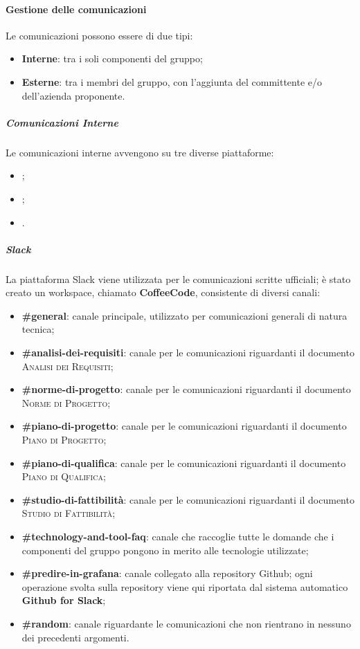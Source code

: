\documentclass[../norme-di-progetto.tex]{subfiles}
\begin{document}
\paragraph{Gestione delle comunicazioni}
Le comunicazioni possono essere di due tipi:
\begin{itemize}
  \item \textbf{Interne}: tra i soli componenti del gruppo;
  \item \textbf{Esterne}: tra i membri del gruppo, con l'aggiunta del committente e/o dell'azienda proponente.
\end{itemize}
\subparagraph{Comunicazioni Interne}
Le comunicazioni interne avvengono su tre diverse piattaforme:
\begin{itemize}
  \item {};
  \item {};
  \item {}.
\end{itemize}
\subparagraph*{Slack}
La piattaforma Slack viene utilizzata per le comunicazioni scritte ufficiali; è stato creato un workspace, chiamato \textbf{CoffeeCode}, consistente di diversi canali:
\begin{itemize}
  \item \textbf{\#general}: canale principale, utilizzato per comunicazioni generali di natura tecnica;
  \item \textbf{\#analisi-dei-requisiti}: canale per le comunicazioni riguardanti il documento \textsc{Analisi dei Requisiti};
  \item \textbf{\#norme-di-progetto}: canale per le comunicazioni riguardanti il documento \textsc{Norme di Progetto};
  \item \textbf{\#piano-di-progetto}: canale per le comunicazioni riguardanti il documento \textsc{Piano di Progetto};
  \item \textbf{\#piano-di-qualifica}: canale per le comunicazioni riguardanti il documento \textsc{Piano di Qualifica};
  \item \textbf{\#studio-di-fattibilità}: canale per le comunicazioni riguardanti il documento \textsc{Studio di Fattibilità};
  \item \textbf{\#technology-and-tool-faq}: canale che raccoglie tutte le domande che i componenti del gruppo pongono in merito alle tecnologie utilizzate;
  \item \textbf{\#predire-in-grafana}: canale collegato alla repository Github; ogni operazione svolta sulla repository viene qui riportata dal sistema automatico \textbf{Github for Slack};
  \item \textbf{\#random}: canale riguardante le comunicazioni che non rientrano in nessuno dei precedenti argomenti.
\end{itemize}
\end{document}
